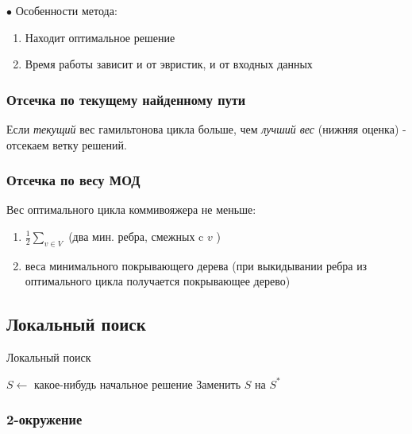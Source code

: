         $\bullet$ Особенности метода:
        \begin{enumerate}
            \item Находит оптимальное решение
            \item Время работы зависит и от эвристик, и от входных данных
        \end{enumerate}
        
        \subsubsection{Отсечка по текущему найденному пути}
            Если \textit{текущий} вес гамильтонова цикла больше, чем \textit{лучший вес} (нижняя оценка) - отсекаем ветку решений.
        
        \subsubsection{Отсечка по весу МОД}
        
            Вес оптимального цикла коммивояжера не меньше:
            \begin{enumerate}
                \item $\frac{1}{2} \sum_{v \in V} $ (два мин. ребра, смежных c $v$ )
                \item  веса минимального покрывающего дерева (при выкидывании ребра из оптимального цикла получается покрывающее дерево)
            \end{enumerate}
        
    \subsection{Локальный поиск}

        \begin{algorithm}
        \caption{Локальный поиск}
        \begin{algorithmic}
            \STATE $S \longleftarrow$ какое-нибудь начальное решение
                \STATE Заменить $S$ на $S^*$ 
            \ENDWHILE
        \end{algorithmic}
        \end{algorithm}
    
        \subsubsection{2-окружение}

